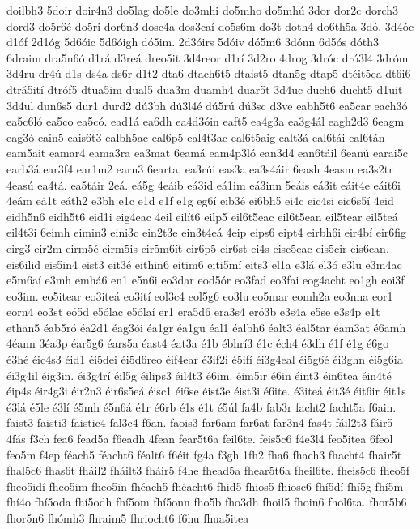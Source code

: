 {doilbh3
5doir
doir4n3
do5lag
do5le
do3mhi
do5mho
do5mhú
3dor
dor2c
dorch3
dord3
do5r6é
do5ri
dor6n3
dosc4a
dos3caí
do5s6m
do3t
doth4
do6th5a
3dó.
3d4óc
d1óf
2d1óg
5d6óic
5d6óigh
dó5im.
2d3óirs
5dóiv
dó5m6
3dónn
6d5ós
dóth3
6draim
dra5n6ó
d1rá
d3reá
dreo5it
3d4reor
d1rí
3d2ro
4drog
3dróc
dró3l4
3dróm
3d4ru
dr4ú
d1s
ds4a
ds6r
d1t2
dta6
dtach6t5
dtaist5
dtan5g
dtap5
dtéit5ea
dt6i6
dtrá5ití
dtróf5
dtua5im
dual5
dua3m
duamh4
duar5t
3d4uc
duch6
ducht5
d1uit
3d4ul
dun6s5
dur1
durd2
dú3bh
dú3l4é
dú5rú
dú3sc
d3ve
eabh5t6
ea5car
each3ó
ea5c6ló
ea5co
ea5có.
ead1á
ea6dh
ea4d3óin
eaft5
ea4g3a
ea3g4ál
eagh2d3
6eagm
eag3ó
eain5
eais6t3
ealbh5ac
eal6p5
eal4t3ac
eal6t5aig
ealt3á
eal6tái
eal6tán
eam5ait
eamar4
eama3ra
ea3mat
6eamá
eam4p3ló
ean3d4
ean6táil
6eanú
earai5c
earb3á
ear3f4
ear1m2
earn3
6earta.
ea3rúi
eas3a
ea3s4áir
6eash
4easm
ea3s2tr
4easú
ea4tá.
ea5táir
2eá.
eá5g
4eáib
eá3id
eá1im
eá3inn
5eáis
eá3it
eáit4e
eáit6i
4eám
eá1t
eáth2
e3bh
e1c
e1d
e1f
e1g
eg6í
eib3é
ei6bh5
ei4c
eic4si
eic6s5í
4eid
eidh5n6
eidh5t6
eid1i
eig4eac
4eil
eilít6
eilp5
eil6t5eac
eil6t5ean
eil5tear
eil5teá
eil4t3i
6eimh
eimin3
eini3c
ein2t3e
ein3t4eá
4eip
eips6
eipt4
eirbh6i
eir4bí
eir6fig
eirg3
eir2m
eirm5é
eirm5is
eir5m6ít
eir6p5
eir6st
ei4s
eisc5eac
eis5cir
eis6ean.
eis6ilid
eis5in4
eist3
eit3é
eithin6
eitim6
eiti5mí
eits3
el1a
e3lá
el3ó
e3lu
e3m4ac
e5m6aí
e3mh
emhá6
en1
e5n6i
eo3dar
eod5ór
eo3fad
eo3fai
eog4acht
eo1gh
eoi3f
eo3im.
eo5itear
eo3iteá
eo3ití
eol3c4
eol5g6
eo3lu
eo5mar
eomh2a
eo3nna
eor1
eorn4
eo3st
eó5d
e5ólac
e5ólaí
er1
era5d6
era3s4
eró3b
e3s4a
e5se
e3s4p
e1t
ethan5
éab5ró
éa2d1
éag3ói
éa1gr
éa1gu
éal1
éalbh6
éalt3
éal5tar
éam3at
é6amh
4éann
3éa3p
éar5g6
éars5a
éast4
éat3a
é1b
ébhrí3
é1c
éch4
é3dh
é1f
é1g
é6go
é3hé
éic4s3
éid1
éi5dei
éi5d6reo
éif4ear
é3if2i
é5ifí
éi3g4eal
éi5g6é
éi3ghn
éi5g6ia
éi3g4il
éig3in.
éi3g4rí
éil5g
éilips3
éil4t3
é6im.
éim5ir
é6in
éint3
éin6tea
éin4té
éip4s
éir4g3i
éir2n3
éir6s5eá
éisc1
éi6se
éist3e
éist3i
é6ite.
é3iteá
éit3é
éit6ir
éit1s
é3lá
é5le
é3lí
é5mh
é5n6á
é1r
é6rb
é1s
é1t
é5úl
fa4b
fab3r
facht2
facht5a
f6ain.
faist3
faisti3
faistic4
fal3c4
f6an.
faois3
far6am
far6at
far3n4
fas4t
fáil2t3
fáir5
4fás
f3ch
fea6
fead5a
f6eadh
4fean
fear5t6a
feil6te.
feis5c6
f4e3l4
feo5itea
6feol
feo5m
f4ep
féach5
féacht6
féalt6
f6éit
fg4a
f3gh
1fh2
fha6
fhach3
fhacht4
fhair5t
fhal5c6
fhas6t
fháil2
fháilt3
fháir5
f4he
fhead5a
fhear5t6a
fheil6te.
fheis5c6
fheo5f
fheo5idí
fheo5im
fheo5in
fhéach5
fhéacht6
fhid5
fhios5
fhiosc6
fhí5dí
fhí5g
fhí5m
fhí4o
fhí5oda
fhí5odh
fhí5om
fhí5onn
fho5b
fho3dh
fhoil5
fhoin6
fhol6ta.
fhor5b6
fhor5n6
fhómh3
fhraim5
fhriocht6
f6hu
fhua5itea
}

